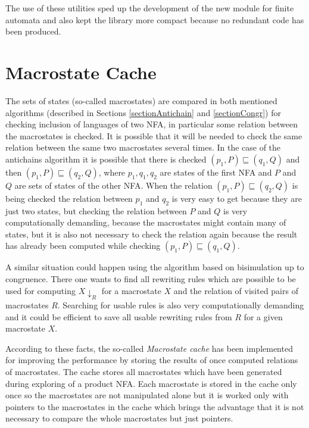 The use of these utilities sped up the development of the new module for finite automata and also kept the library more compact because no
redundant code has been produced.

\section{Macrostate Cache}
\label{sectionCache}
The sets of states (so-called macrostates) are compared in both mentioned algorithms (described in Sections \ref{sectionAntichain} and \ref{sectionCongr}) 
for checking inclusion of languages of two NFA, 
in particular some relation between the macrostates is checked. It is possible that it will be needed to check the same relation between the same
two macrostates several times. In the case of the antichains algorithm it is possible that 
there is checked $(p_1,P) \sqsubseteq (q_1,Q)$ and then $(p_1,P)\sqsubseteq
(q_2,Q)$, where $p_1,q_1,q_2$ are states of the first NFA and $P$ and $Q$ are sets of states of the other NFA. 
When the relation $(p_1,P)\sqsubseteq(q_2,Q)$ is being checked the relation between $p_1$ and $q_2$ is very easy to get because they are just two states, 
but checking the relation between $P$ and $Q$ is very computationally demanding, because the macrostates might contain many of states, 
but it is also not necessary to check the relation again because the result has already been computed while checking $(p_1,P) \sqsubseteq (q_1,Q)$. 

A similar situation could happen using the algorithm based on bisimulation up to congruence. There one wants to find all rewriting rules which are possible to be
used for computing $X{\downarrow_R}$ for a macrostate $X$ and the relation of visited pairs of macrostates $R$. Searching 
for usable rules is also very computationally demanding and it could be efficient to save all usable rewriting rules from $R$ for a given macrostate $X$.

According to these facts, the so-called \emph{Macrostate cache} has been implemented for improving the performance by storing the results of 
once computed relations of macrostates. The cache stores all macrostates which have been generated during exploring of a product NFA. Each macrostate is 
stored in the cache only once so the macrostates are not manipulated alone  
but it is worked only with pointers to the macrostates in the cache which brings the advantage that it is not 
necessary to compare the whole macrostates but just pointers.

